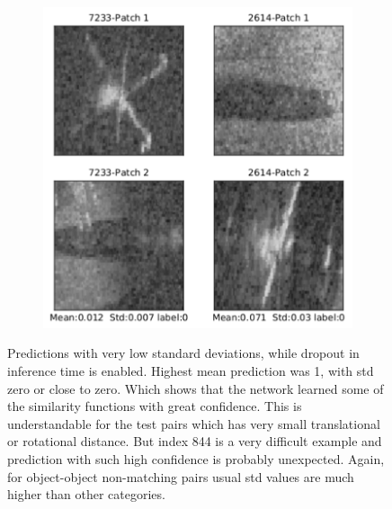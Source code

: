 \begin{figure}[ht]
\begin{subfigure}[b]{4.2cm}
    \label{fig:prediction_images_lowest_stds_2}
  \end{subfigure}  
  ~
  \begin{subfigure}[b]{4.2cm}
    \includegraphics[width=\textwidth]{images/densenet/prediction_images_lowest_stds_3_grey}
    \label{fig:prediction_images_lowest_stds_3}
  \end{subfigure} 
  \caption[MC. predictions with lowest std.]{Predictions with very low standard deviations, while dropout in inference time is enabled. Highest mean prediction was 1, with std zero or close to zero. Which shows that the network learned some of the similarity functions with great confidence. This is understandable for the test pairs which has very small translational or
  rotational distance. But index 844 is a very difficult example and prediction with such high confidence is probably unexpected. Again, for object-object non-matching pairs usual std values are much higher than other categories.}
  \label{fig:mc_prediction_lowest_std}
\end{figure}

\flushbottom
\newpage

